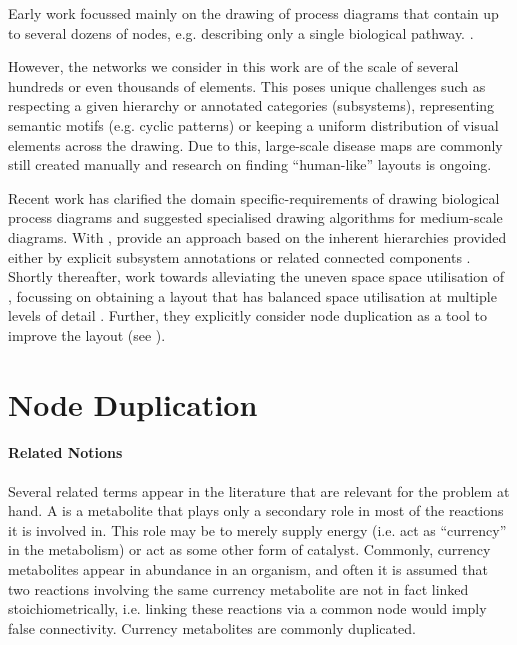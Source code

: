 \documentclass[
	fontsize=10pt, %
	twoside=false, %
	secnumdepth=1, %
  toc=indentunnumbered %
]{kaobook}
\begin{document}
Early work focussed mainly on the drawing of process diagrams that contain up to
several dozens of nodes, e.g. describing only a single biological pathway.
\cite{becker_GraphLayoutAlgorithm_2001}
\cite{schreiber_ComparisonMetabolicPathways_2003}.

However, the networks we consider in this work are of the scale of several
hundreds or even thousands of elements. This poses unique challenges such as
respecting a given hierarchy or annotated categories (subsystems), representing semantic
motifs (e.g. cyclic patterns) or keeping a uniform distribution of visual
elements across the drawing. Due to this, large-scale disease maps are commonly
still created manually and research on finding ``human-like'' layouts is ongoing.

Recent work \cite{siebenhaller_HumanlikeLayoutAlgorithms_2020,
  kieffer_HOLAHumanlikeOrthogonal_2016} has clarified the domain
specific-requirements of drawing biological process diagrams and suggested
specialised drawing algorithms for medium-scale diagrams.
%
With , \citeauthor{wu_MetabopolisScalableNetwork_2019}
provide an approach based on the inherent hierarchies provided either by
explicit subsystem annotations or related connected components
\cite{wu_MetabopolisScalableNetwork_2019}.
%
Shortly thereafter, \citeauthor{wu_MultilevelAreaBalancing_2020} work towards
alleviating the uneven space space utilisation of ,
focussing on obtaining a layout that has balanced space utilisation at multiple
levels of detail \cite{wu_MultilevelAreaBalancing_2020}. Further, they
explicitly consider node duplication as a tool to improve the layout (see ).



\section{Node Duplication}
\label{sec:node-duplication}

\paragraph{Related Notions} Several related terms appear in the literature that
are relevant for the problem at hand. A 
\cite{huss_CurrencyCommodityMetabolites_2007}
is a metabolite that plays only a secondary
role in most of the reactions it is involved in. This role may be to merely
supply energy (i.e. act as ``currency'' in the metabolism) or act as some other
form of catalyst. Commonly, currency metabolites appear in abundance in an
organism, and often it is assumed that two reactions involving the same currency
metabolite are not in fact linked stoichiometrically, i.e. linking these
reactions via a common node would imply false connectivity.
Currency metabolites are commonly duplicated.
\end{document}
